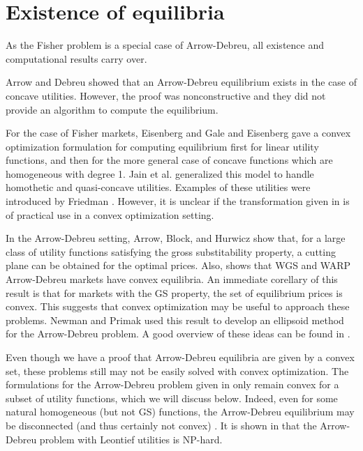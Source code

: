\documentclass{article}
\begin{document}
\section{Existence of equilibria}

As the Fisher problem is a special case of Arrow-Debreu, all existence and computational results carry over.

Arrow and Debreu \cite{arrow1954existence} showed that an Arrow-Debreu equilibrium exists in the case of concave utilities. 
However, the proof was nonconstructive and they did not provide an algorithm to compute the equilibrium.

For the case of Fisher markets,
Eisenberg and Gale \cite{eisenberg1959consensus, gale1960theory} and
Eisenberg \cite{eisenberg1961aggregation} gave a convex optimization formulation for computing equilibrium first for linear utility functions, and then for the more general case of concave functions which are homogeneous with degree 1.
Jain et al. \cite{jain2005market} generalized this model to handle homothetic and quasi-concave utilities.
Examples of these utilities were introduced by Friedman
\cite{friedman1973concavity}.
However, it is unclear if the transformation given in \cite{jain2005market} is of practical use in a convex optimization setting.

In the Arrow-Debreu setting, Arrow, Block, and Hurwicz \cite{arrow1958stability} show that, for a large class of utility functions satisfying the gross substitability property, a cutting plane can be obtained for the optimal prices.
Also, \cite[p.~608]{mas1995microeconomic} shows that WGS and WARP Arrow-Debreu markets have convex equilibria.
An immediate corellary of this result is that for markets with the GS property, the set of equilibrium prices is convex.
This suggests that convex optimization may be useful to approach these problems.
Newman and Primak \cite{newman1992complexity} used this result to develop an ellipsoid method for the Arrow-Debreu problem.
A good overview of these ideas can be found in \cite{codenotti2005polynomial}.

Even though we have a proof that Arrow-Debreu equilibria are given by a convex set, these problems still may not be easily solved with convex optimization.
The formulations for the Arrow-Debreu problem given in \cite{jain2007polynomial,chen2007note,chen2010equilibrium} only remain convex for a subset of utility functions, which we will discuss below.
Indeed, even for some natural homogeneous (but not GS) functions, the Arrow-Debreu equilibrium may be disconnected (and thus certainly not convex) \cite{gjerstad1996multiple}.
It is shown in \cite{codenotti2006leontief} that the Arrow-Debreu problem with Leontief utilities is NP-hard.
\end{document}
